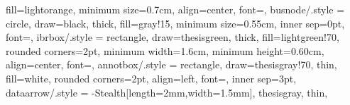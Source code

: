 {{                    fill=lightorange, minimum size=0.7cm,
                    align=center, font=\tiny},
  busnode/.style  = {circle, draw=black, thick,
                    fill=gray!15, minimum size=0.55cm,
                    inner sep=0pt, font=\scriptsize},
  ibrbox/.style   = {rectangle, draw=thesisgreen, thick,
                    fill=lightgreen!70, rounded corners=2pt,
                    minimum width=1.6cm, minimum height=0.60cm,
                    align=center, font=\scriptsize},
  annotbox/.style = {rectangle, draw=thesisgray!70, thin,
                    fill=white, rounded corners=2pt,
                    align=left, font=\scriptsize,
                    inner sep=3pt},
  dataarrow/.style = {-{Stealth[length=2mm,width=1.5mm]},
                      thesisgray, thin},
}

\newcommand{\drawinductor}[3][]{%
  \draw[#1] (#2) -- ++(0.15,0)
    \foreach \i in {1,2,3,4}{arc(90:-90:0.08) -- ++(0,0)}
    -- (#3);
}

\newcommand{\phasor}[1]{\underline{#1}}
\newcommand{\cplx}[1]{\mathbf{#1}}
\newcommand{\jj}{\mathrm{j}}
\newcommand{\dq}[1]{#1_{dq}}
\newcommand{\pu}{\ \mathrm{pu}}
\newcommand{\degs}{^{\circ}}
\newcommand{\dt}{\mathrm{d}t}
\newcommand{\Ts}{T_\mathrm{s}}

\newcommand{\seqpos}[1]{#1^{(+)}}
\newcommand{\seqneg}[1]{#1^{(-)}}
\newcommand{\seqzer}[1]{#1^{(0)}}
\newcommand{\Ipos}{\seqpos{I}}
\newcommand{\Ineg}{\seqneg{I}}
\newcommand{\Izer}{\seqzer{I}}
\newcommand{\Vpos}{\seqpos{V}}
\newcommand{\Vneg}{\seqneg{V}}
\newcommand{\Vzer}{\seqzer{V}}

\newcommand{\vd}{v_d}
\newcommand{\vq}{v_q}
\newcommand{\id}{i_d}
\newcommand{\iq}{i_q}

\newcommand{\Irated}{I_\mathrm{rated}}
\newcommand{\Ipickup}{I_\mathrm{pu}}
\newcommand{\Iscc}{I_\mathrm{sc}}
\newcommand{\ttrip}{t_\mathrm{trip}}
\newcommand{\Zreach}{Z_\mathrm{reach}}
\newcommand{\Zs}{Z_\mathrm{S}}
\newcommand{\ZR}{Z_\mathrm{R}}
\newcommand{\ZL}{Z_L}
\newcommand{\ZF}{Z_F}


